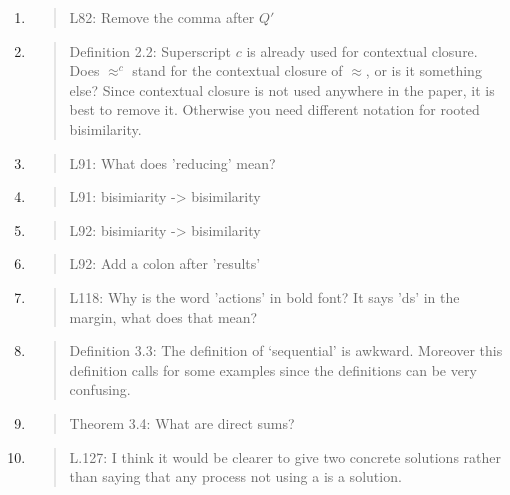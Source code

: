\begin{enumerate}
\item \begin{quote}
    L82: Remove the comma after $Q'$
  \end{quote}

\item \begin{quote}
    Definition 2.2: Superscript $c$ is already used for contextual closure.
    Does $\approx^c$ stand for the contextual closure of $\approx$, or is it something else?
    Since contextual closure is not used anywhere in the paper, it is best to remove it.
    Otherwise you need different notation for rooted bisimilarity.
  \end{quote}

\item \begin{quote}
    L91: What does 'reducing' mean?
  \end{quote}

\item \begin{quote}
    L91: bisimiarity -> bisimilarity
  \end{quote}

\item \begin{quote}
    L92: bisimiarity -> bisimilarity
  \end{quote}

\item \begin{quote}
    L92: Add a colon after 'results'
  \end{quote}

\item \begin{quote}
    L118: Why is the word 'actions' in bold font? It says 'ds' in the margin, what does that mean?
  \end{quote}

\item \begin{quote}
Definition 3.3: The definition of ‘sequential’ is awkward.  Moreover
this definition calls for some examples since the definitions can be
very confusing.
  \end{quote}

\item \begin{quote}
Theorem 3.4: What are direct sums?
  \end{quote}

\item \begin{quote}
    L.127: I think it would be clearer to give two concrete solutions
    rather than saying that any process not using a is a solution.
  \end{quote}


\end{enumerate}
